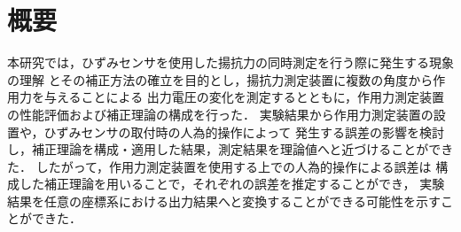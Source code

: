 
\maketitle
\section*{概要}

本研究では，ひずみセンサを使用した揚抗力の同時測定を行う際に発生する現象の理解
とその補正方法の確立を目的とし，揚抗力測定装置に複数の角度から作用力を与えることによる
出力電圧の変化を測定するとともに，作用力測定装置の性能評価および補正理論の構成を行った．
実験結果から作用力測定装置の設置や，ひずみセンサの取付時の人為的操作によって
発生する誤差の影響を検討し，補正理論を構成・適用した結果，測定結果を理論値へと近づけることができた．
したがって，作用力測定装置を使用する上での人為的操作による誤差は
構成した補正理論を用いることで，それぞれの誤差を推定することができ，
実験結果を任意の座標系における出力結果へと変換することができる可能性を示すことができた．

\newpage
\setcounter{tocdepth}{3}
\tableofcontents
\newpage

